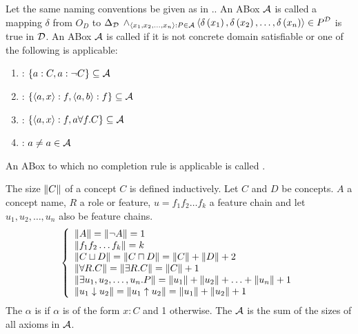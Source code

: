 \begin{defi}
Let the same naming conventions be given as in .. An ABox $\mathcal{A}$ is called  \iffTx{} \teTx{} a mapping $\delta$ from $O_D$ to $\Delta_{\mathcal{D}}$ \stTx{} $\displaystyle\wedge_{\left\langle x_1,x_2,\ldots,x_n\right\rangle:P\in\mathcal{A}}\left\langle \delta\left(x_1\right),\delta\left(x_2\right),\ldots,\delta\left(x_n\right)\right\rangle\in P^{\mathcal{D}}$ is true in $\mathcal{D}$. An ABox $\mathcal{A}$ is called  if it is not concrete domain satisfiable or one of the following  is applicable:
\begin{enumerate}
 \item {}: $\left\{ a:C,a:\neg C\right\}\subseteq\mathcal{A}$
 \item {}: $\left\{ \left\langle a,x\right\rangle:f,\left\langle a,b\right\rangle:f\right\}\subseteq\mathcal{A}$
 \item {}: $\left\{ \left\langle a,x\right\rangle:f,a\forall f.C\right\}\subseteq\mathcal{A}$
 \item {}: $a\neq a\in\mathcal{A}$
\end{enumerate}
An ABox to which no completion rule is applicable is called .
\cite{conf/ijcai/Lutz99}
\end{defi}

\begin{defi}
The size $\left\|C\right\|$ of a concept $C$ is defined inductively. Let $C$ and $D$ be concepts. $A$ a concept name, $R$ a role or feature, $u=f_1f_2\ldots f_k$ a feature chain and let $u_1,u_2,\ldots,u_n$ also be feature chains.
\begin{equation}
\left\{\begin{array}{l}\left\|A\right\|=\left\|\neg A\right\|=1\\
\left\|f_1f_2\ldots f_k\right\|=k\\
\left\|C\sqcup D\right\|=\left\|C\sqcap D\right\|=\left\|C\right\|+\left\|D\right\|+2\\
\left\|\forall R.C\right\|=\left\|\exists R.C\right\|=\left\|C\right\|+1\\
\left\|\exists u_1,u_2,\ldots,u_n.P\right\|=\left\|u_1\right\|+\left\|u_2\right\|+\ldots+\left\|u_n\right\|+1\\
\left\|u_1\downarrow u_2\right\|=\left\|u_1\uparrow u_2\right\|=\left\|u_1\right\|+\left\|u_2\right\|+1\end{array}\right.
\end{equation}
The  $\alpha$ is  if $\alpha$ is of the form $x:C$ and 1 otherwise. The  $\mathcal{A}$ is the sum of the sizes of all axioms in $\mathcal{A}$.
\cite{conf/ijcai/Lutz99}
\end{defi}


